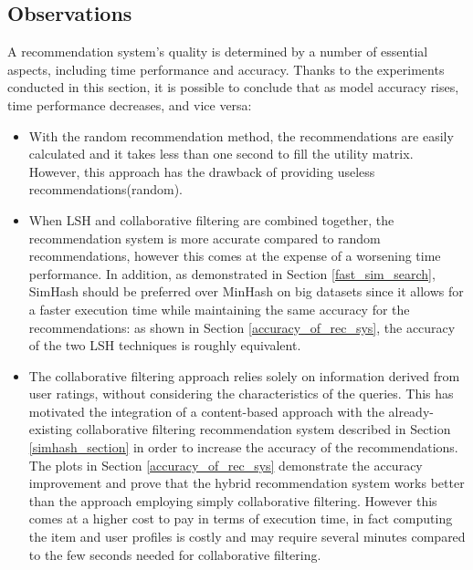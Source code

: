 \subsection{Observations}
A recommendation system's quality is determined by a number of essential aspects, including time performance and accuracy. Thanks to the experiments conducted in this section, it is possible to conclude that as model accuracy rises, time performance decreases, and vice versa:
\begin{itemize}
    \item With the random recommendation method, the recommendations are easily calculated and it takes less than one second to fill the utility matrix. However, this approach has the drawback of providing useless recommendations(random).
    \item When LSH and collaborative filtering are combined together, the recommendation system is more accurate compared to random recommendations, however this comes at the expense of a worsening time performance. In addition, as demonstrated in Section \ref{fast_sim_search}, SimHash should be preferred over MinHash on big datasets since it allows for a faster execution time while maintaining the same accuracy for the recommendations: as shown in Section \ref{accuracy_of_rec_sys}, the accuracy of the two LSH techniques is roughly equivalent. 
    \item The collaborative filtering approach relies solely on information derived from user ratings, without considering the characteristics of the queries. This has motivated the integration of a content-based approach with the already-existing collaborative filtering recommendation system described in Section \ref{simhash_section} in order to increase the accuracy of the recommendations. The plots in Section \ref{accuracy_of_rec_sys} demonstrate the accuracy improvement and prove that the hybrid recommendation system works better than the approach employing simply collaborative filtering. However this comes at a higher cost to pay in terms of execution time, in fact computing the item and user profiles is costly and may require several minutes compared to the few seconds needed for collaborative filtering.
\end{itemize}


